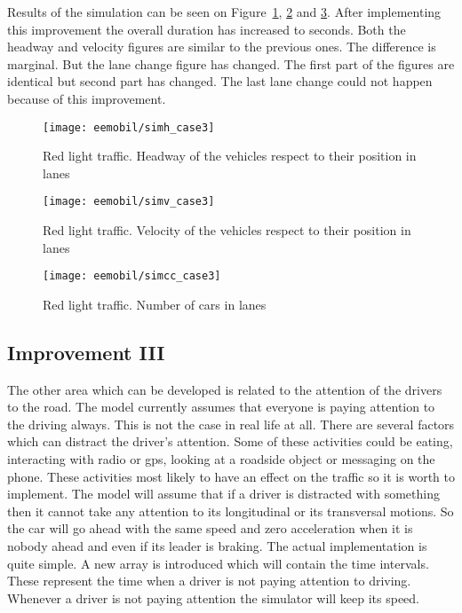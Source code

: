 		Results of the simulation can be seen on Figure~\ref{fig:red_light_situationh_impr2}, \ref{fig:red_light_situationv_impr2} and \ref{fig:red_light_situationcc_impr2}. After implementing this improvement the overall duration has increased to seconds. Both the headway and velocity figures are similar to the previous ones. The difference is marginal. But the lane change figure has changed. The first part of the figures are identical but second part has changed. The last lane change could not happen because of this improvement.
		\begin{figure}[ht]
			\centering
			\texttt{[image: eemobil/simh\_case3]}
			\caption{Red light traffic. Headway of the vehicles respect to their position in lanes}
			\label{fig:red_light_situationh_impr2}
		\end{figure}
		\begin{figure}
			\centering
			\texttt{[image: eemobil/simv\_case3]}
			\caption{Red light traffic. Velocity of the vehicles respect to their position in lanes}
			\label{fig:red_light_situationv_impr2}
		\end{figure}
		\begin{figure}
			\centering
			\texttt{[image: eemobil/simcc\_case3]}
			\caption{Red light traffic. Number of cars in lanes }
			\label{fig:red_light_situationcc_impr2}
		\end{figure}
		\subsection{Improvement III}
		The other area which can be developed is related to the attention of the drivers to the road. The model currently assumes that everyone is paying attention to the driving always. This is not the case in real life at all. There are several factors which can distract the driver's attention. Some of these activities could be eating, interacting with radio or gps, looking at a roadside object or messaging on the phone. These activities most likely to have an effect on the traffic so it is worth to implement. The model will assume that if a driver is distracted with something then it cannot take any attention to its longitudinal or its transversal motions. So the car will go ahead with the same speed and zero acceleration when it is nobody ahead and even if its leader is braking. The actual implementation is quite simple. A new array is introduced which will contain the time intervals. These represent the time when a driver is not paying attention to driving. Whenever a driver is not paying attention the simulator will keep its speed.

